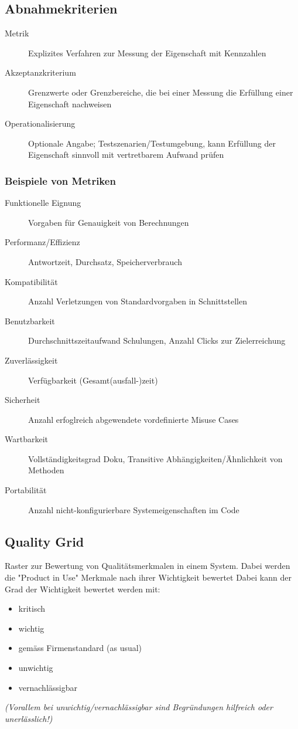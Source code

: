 \documentclass[a4paper]{article}
\begin{document}
		\subsection{Abnahmekriterien}
		
		\begin{description}
			\item[Metrik] Explizites Verfahren zur Messung der Eigenschaft mit Kennzahlen
			\item[Akzeptanzkriterium] Grenzwerte oder Grenzbereiche, die bei einer Messung die Erfüllung einer Eigenschaft nachweisen
			\item[Operationalisierung] Optionale Angabe; Testszenarien/Testumgebung, kann Erfüllung der Eigenschaft sinnvoll mit vertretbarem Aufwand prüfen
		\end{description}
	
\newpage
	
			\subsubsection{Beispiele von Metriken}
			
			\begin{description}
				\item[Funktionelle Eignung] Vorgaben für Genauigkeit von Berechnungen
				\item[Performanz/Effizienz] Antwortzeit, Durchsatz, Speicherverbrauch
				\item[Kompatibilität] Anzahl Verletzungen von Standardvorgaben in Schnittstellen
				\item[Benutzbarkeit] Durchschnittszeitaufwand Schulungen, Anzahl Clicks zur Zielerreichung
				\item[Zuverlässigkeit] Verfügbarkeit (Gesamt(ausfall-)zeit)
				\item[Sicherheit] Anzahl erfoglreich abgewendete vordefinierte Misuse Cases
				\item[Wartbarkeit] Vollständigkeitsgrad Doku, Transitive Abhängigkeiten/Ähnlichkeit von Methoden
				\item[Portabilität] Anzahl nicht-konfigurierbare Systemeigenschaften im Code
			\end{description}
	
		\subsection{Quality Grid}
		
		Raster zur Bewertung von Qualitätsmerkmalen in einem System.
		Dabei werden die "Product in Use" Merkmale nach ihrer Wichtigkeit bewertet
		Dabei kann der Grad der Wichtigkeit bewertet werden mit:
		\begin{itemize}
			\item kritisch
			\item wichtig
			\item gemäss Firmenstandard (as usual)
			\item unwichtig
			\item vernachlässigbar
		\end{itemize}
		\textit{(Vorallem bei unwichtig/vernachlässigbar sind Begründungen hilfreich oder unerlässlich!)}
\end{document}
